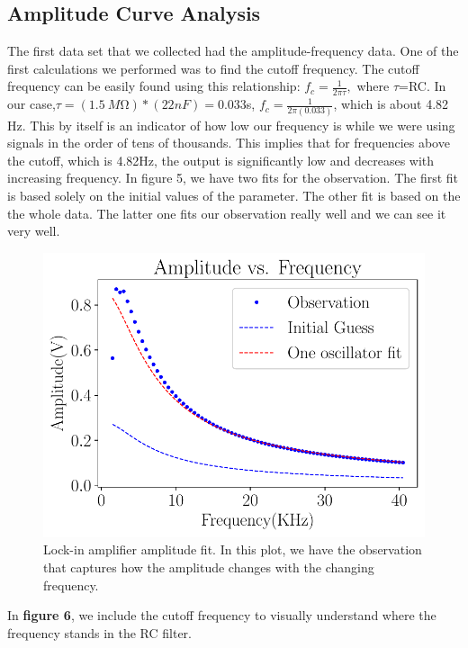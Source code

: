 \documentclass[twocolumn]{article}\usepackage[english]{babel}
\begin{document}
\subsection{Amplitude Curve Analysis}
The first data set that we collected had the amplitude-frequency data. One of the first calculations we performed was to find the cutoff frequency.
The cutoff frequency can be easily found using this relationship:
\(f_{c}=\frac{1}{2\pi\tau}, \) where $\tau$=RC. \newline
In our case,\(\tau=(\SI{1.5}{M\ohm})*(22nF)=0.033\)s, \newline
\(f_c=\frac{1}{2\pi(0.033)}\), which is about 4.82 Hz. This by itself is an indicator of how low our frequency is while we were using signals in the order of tens of thousands. This implies that for frequencies above the cutoff, which is 4.82Hz, the output is significantly low and decreases with increasing frequency.
In figure 5, we have two fits for the observation. The first fit is based solely on the initial values of the parameter. The other fit is based on the the whole data. The latter one fits our observation really well and we can see it very well.
\begin{figure}
\includegraphics[width=\linewidth]{images/v2/LA-Amplitude Fit.pdf}
\caption{Lock-in amplifier amplitude fit. In this plot, we have the observation that captures how the amplitude changes with the changing frequency. }
  \label{fig:LA Ampt fit}
\end{figure}
In \textbf{figure 6}, we include the cutoff frequency to visually understand where the frequency stands in the RC filter.
\end{document}
